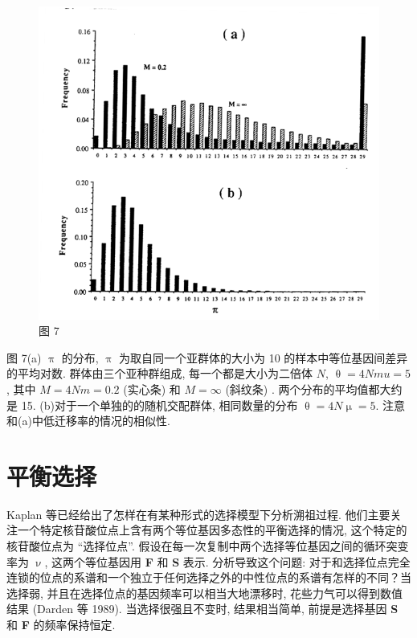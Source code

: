 \documentclass[12pt]{article}
\begin{document}
\begin{figure}
    \centering
    \includegraphics{coalescent-process.images/image7.png}
    \caption{图 7}
\end{figure}

图 7(a) $\uppi$ 的分布, $\uppi$ 为取自同一个亚群体的大小为 10 的样本中等位基因间差异的平均对数. 群体由三个亚种群组成,
每一个都是大小为二倍体 $N$, $\uptheta =4Nmu =5$, 其中 $M=4Nm=0.2$ (实心条) 和 $M=\mathrm{\infty}$ (斜纹条) .
两个分布的平均值都大约是 15. (b)对于一个单独的的随机交配群体, 相同数量的分布 $\uptheta =4N\upmu =5$.
注意和(a)中低迁移率的情况的相似性.

\section{平衡选择}

Kaplan 等已经给出了怎样在有某种形式的选择模型下分析溯祖过程.
他们主要关注一个特定核苷酸位点上含有两个等位基因多态性的平衡选择的情况, 这个特定的核苷酸位点为 ``选择位点''.
假设在每一次复制中两个选择等位基因之间的循环突变率为 $\upnu$, 这两个等位基因用 \textbf{F} 和 \textbf{S} 表示.
分析导致这个问题: 对于和选择位点完全连锁的位点的系谱和一个独立于任何选择之外的中性位点的系谱有怎样的不同？当选择弱,
并且在选择位点的基因频率可以相当大地漂移时, 花些力气可以得到数值结果 (Darden 等 1989). 当选择很强且不变时,
结果相当简单, 前提是选择基因 \textbf{S} 和 \textbf{F} 的频率保持恒定.
\end{document}
